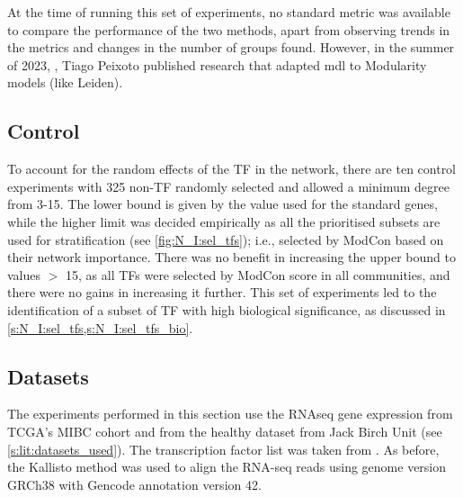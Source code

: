 At the time of running this set of experiments, no standard metric was available to compare the performance of the two methods, apart from observing trends in the metrics and changes in the number of groups found. However, in the summer of 2023, \cite{Peixoto2023-se}, Tiago Peixoto published research that adapted \acrshort{mdl} to Modularity models (like Leiden).

\subsection*{Control}

To account for the random effects of the TF in the network, there are ten control experiments with 325 non-TF randomly selected and allowed a minimum degree from 3-15. The lower bound is given by the value used for the standard genes, while the higher limit was decided empirically as all the prioritised subsets are used for stratification (see \cref{fig:N_I:sel_tfs}); i.e., selected by ModCon based on their network importance. There was no benefit in increasing the upper bound to values $>$ 15, as all TFs were selected by ModCon score in all communities, and there were no gains in increasing it further. This set of experiments led to the identification of a subset of TF with high biological significance, as discussed in \cref{s:N_I:sel_tfs,s:N_I:sel_tfs_bio}.

\subsection*{Datasets}

The experiments performed in this section use the RNAseq gene expression from TCGA's MIBC cohort and from the healthy dataset from Jack Birch Unit (see \cref{s:lit:datasets_used}). The transcription factor list was taken from \citet{Lambert2018-el}. As before, the Kallisto method was used to align the RNA-seq reads using genome version GRCh38 with Gencode annotation version 42. 


